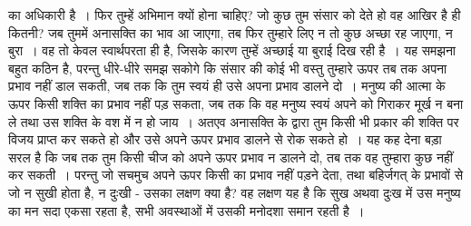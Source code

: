 का अधिकारी है~। फिर तुम्हें अभिमान क्यों होना चाहिए? जो कुछ तुम संसार को देते हो वह आखिर है ही कितनी? जब तुममें अनासक्ति का भाव आ जाएगा, तब फिर तुम्हारे लिए न तो कुछ अच्छा रह जाएगा, न बुरा~। वह तो केवल स्वार्थपरता ही है, जिसके कारण तुम्हें अच्छाई या बुराई दिख रही है~। यह समझना बहुत कठिन है, परन्तु धीरे-धीरे समझ सकोगे कि संसार की कोई भी वस्तु तुम्हारे ऊपर तब तक अपना प्रभाव नहीं डाल सकती, जब तक कि तुम स्वयं ही उसे अपना प्रभाव डालने दो~। मनुष्य की आत्मा के ऊपर किसी शक्ति का प्रभाव नहीं पड़ सकता, जब तक कि वह मनुष्य स्वयं अपने को गिराकर मूर्ख न बना ले तथा उस शक्ति के वश में न हो जाय~। अतएव अनासक्ति के द्वारा तुम किसी भी प्रकार की शक्ति पर विजय प्राप्त कर सकते हो और उसे अपने ऊपर प्रभाव डालने से रोक सकते हो~। यह कह देना बड़ा सरल है कि जब तक तुम किसी चीज को अपने ऊपर प्रभाव न डालने दो, तब तक वह तुम्हारा कुछ नहीं कर सकती~। परन्तु जो सचमुच अपने ऊपर किसी का प्रभाव नहीं पड़ने देता, तथा बहिर्जगत् के प्रभावों से जो न सुखी होता है, न दुःखी - उसका लक्षण क्या है? वह लक्षण यह है कि सुख अथवा दुःख में उस मनुष्य का मन सदा एकसा रहता है, सभी अवस्थाओं में उसकी मनोदशा समान रहती है~।

